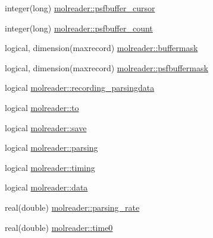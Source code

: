 \begin{DoxyCompactItemize}
\item 
integer(long) \hyperlink{namespacemolreader_ab080c636a2423beb139bdd65dcd884c3}{molreader\+::psfbuffer\+\_\+cursor}
\item 
integer(long) \hyperlink{namespacemolreader_af2dddaa7f6249a39287ffcdcbe2ce558}{molreader\+::psfbuffer\+\_\+count}
\item 
logical, dimension(maxrecord) \hyperlink{namespacemolreader_a3368bfc7f2d07a7f472a8118220516a9}{molreader\+::buffermask}
\item 
logical, dimension(maxrecord) \hyperlink{namespacemolreader_a747bd2c32990916c313506c805317e88}{molreader\+::psfbuffermask}
\item 
logical \hyperlink{namespacemolreader_a1f82d6f3302ab89b43d1fcbcba5d8fb2}{molreader\+::recording\+\_\+parsingdata}
\item 
logical \hyperlink{namespacemolreader_aec460f295b88cb8eb8dd58901edce0ba}{molreader\+::to}
\item 
logical \hyperlink{namespacemolreader_af3ae5caa4d00fa50c74d2f3154e8ea7c}{molreader\+::save}
\item 
logical \hyperlink{namespacemolreader_a151a8b8c33b86ab86d352aeaaf9ec84b}{molreader\+::parsing}
\item 
logical \hyperlink{namespacemolreader_a29899cd9778ac12af6bad404c1092518}{molreader\+::timing}
\item 
logical \hyperlink{namespacemolreader_ad29941441961d6bb225120cc88f93db7}{molreader\+::data}
\item 
real(double) \hyperlink{namespacemolreader_a5cf7dc5ccdeb068704a693ec6b248796}{molreader\+::parsing\+\_\+rate}
\item 
real(double) \hyperlink{namespacemolreader_ad5b1ed6898caa1c2161f0cdc6c10fc72}{molreader\+::time0}
\end{DoxyCompactItemize}
